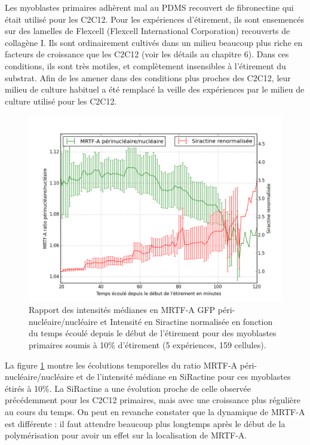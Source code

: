 Les myoblastes primaires adhèrent mal au PDMS recouvert de fibronectine qui était utilisé pour les C2C12. Pour les expériences d'étirement, ils sont ensemencés sur des lamelles de Flexcell (Flexcell International Corporation) recouverts de collagène I. 
Ils sont ordinairement cultivés dans un milieu beaucoup plus riche en facteurs de croissance que les C2C12 (voir les détails au chapitre 6). 
Dans ces conditions, ils sont très motiles, et complètement insensibles à l'étirement du substrat. 
Afin de les amener dans des conditions plus proches des C2C12, leur milieu de culture habituel a été remplacé la veille des expériences par le milieu de culture utilisé pour les C2C12. 

\begin{figure}
\includegraphics[scale=0.4]{Figures/Siractine_MRTFA_vs_temps.png} 
\caption{Rapport des intensités médianes en MRTF-A GFP  péri-nucléaire/nucléaire et Intensité en Siractine normalisée en fonction du temps écoulé depuis le début de l'étirement pour des myoblastes primaires soumis à 10\% d'étirement (5 expériences, 159 cellules). \label{myoblastes_Sir}}
\end{figure}

La figure \ref{myoblastes_Sir} montre les écolutions temporelles du ratio MRTF-A péri-nucléaire/nucléaire et de l'intensité médiane en SiRactine pour ces myoblastes étirés à 10\%. 
La SiRactine a une évolution proche de celle observée précédemment pour les C2C12 primaires, mais avec une croissance plus régulière au cours du temps. On peut en revanche constater que la dynamique de MRTF-A est différente : il faut attendre beaucoup plus longtemps après le début de la polymérisation pour avoir un effet sur la localisation de MRTF-A. 

